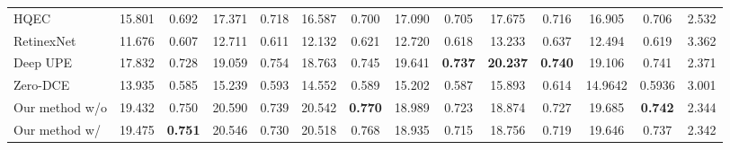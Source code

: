 \documentclass[final]{cvpr}
\begin{document}
\begin{table*}
\begin{center}
{\begin{tabular}{|l|c|c|c|c|c|c|c|c|c|c|c|c|c|}
\cellcolor[HTML]{D5D5D5}HQEC \cite{HQEC} & 15.801 & 0.692 & 17.371 & 0.718 & 16.587 & 0.700 & 17.090 & 0.705 & 17.675 & 0.716 & 16.905 & 0.706 & 2.532\\
\cellcolor[HTML]{D5D5D5}RetinexNet \cite{Chen2018Retinex}  & 11.676 & 0.607 & 12.711 & 0.611 & 12.132 & 0.621 & 12.720 & 0.618 & 13.233 & 0.637 & 12.494 & 0.619 & 3.362\\
\cellcolor[HTML]{D5D5D5}Deep UPE \cite{DeepUPE} & 17.832 & 0.728 & 19.059 & \cellcolor[HTML]{FFFBA3}0.754 & 18.763 & \cellcolor[HTML]{FFCCCB}0.745 & \cellcolor[HTML]{FFFBA3}19.641 & \cellcolor[HTML]{79CC7A}\textbf{0.737} & \cellcolor[HTML]{79CC7A}\textbf{20.237} & \cellcolor[HTML]{79CC7A}\textbf{0.740} & 19.106 & \cellcolor[HTML]{FFFBA3}0.741 & 2.371\\ 
\cellcolor[HTML]{D5D5D5}Zero-DCE \cite{guo2020zero}  & 13.935 & 0.585 & 15.239 & 0.593 & 14.552 & 0.589 & 15.202 & 0.587 & 15.893 & 0.614 & 14.9642 & 0.5936 & 3.001 \\
\hdashline
Our method w/o  & \cellcolor[HTML]{FFCCCB}19.432 & \cellcolor[HTML]{FFFBA3}0.750 & 20.590 & \cellcolor[HTML]{FFCCCB}0.739 & \cellcolor[HTML]{FFFBA3}20.542 & \cellcolor[HTML]{79CC7A}\textbf{0.770} & 18.989 & \cellcolor[HTML]{FFCCCB}0.723 & 18.874 & \cellcolor[HTML]{FFFBA3}0.727 & 19.685 & \cellcolor[HTML]{79CC7A}\textbf{0.742} & 2.344 \\
Our method w/  & 19.475 & \cellcolor[HTML]{79CC7A}\textbf{0.751} & 20.546 & 0.730 & \cellcolor[HTML]{FFCCCB}20.518 & \cellcolor[HTML]{FFFBA3}0.768 & 18.935 & 0.715 & 18.756 & 0.719 & 19.646 & \cellcolor[HTML]{FFCCCB}0.737 &  \cellcolor[HTML]{FFCCCB}2.342\\\hline



\end{tabular}}
\end{center}
\end{table*}
\end{document}
